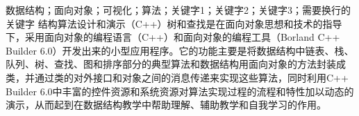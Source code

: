 


\begin{cnabstract}{数据结构；面向对象；可视化；算法；关键字1；关键字2；关键字3；需要换行的关键字}
结构算法设计和演示（C++）树和查找是在面向对象思想和技术的指导下，采用面向对象的编程语言（C++）和面向对象的编程工具（Borland C++ Builder 6.0）开发出来的小型应用程序。它的功能主要是将数据结构中链表、栈、队列、树、查找、图和排序部分的典型算法和数据结构用面向对象的方法封装成类，并通过类的对外接口和对象之间的消息传递来实现这些算法，同时利用C++ Builder 6.0中丰富的控件资源和系统资源对算法实现过程的流程和特性加以动态的演示，从而起到在数据结构教学中帮助理解、辅助教学和自我学习的作用。
\end{cnabstract}


